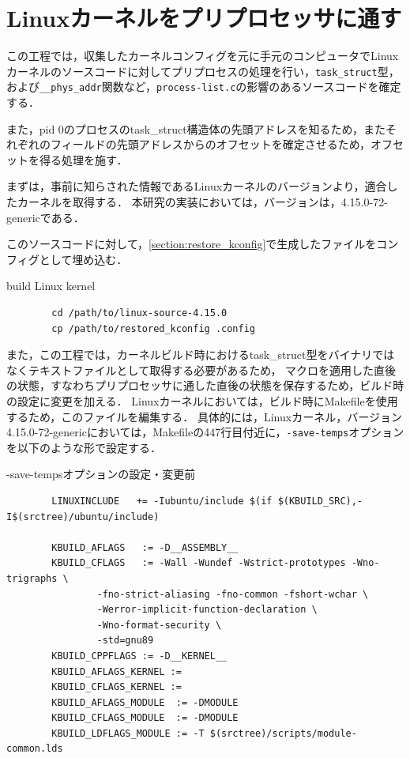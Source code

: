 \section{Linuxカーネルをプリプロセッサに通す}
\label{section:preprocess}

この工程では，収集したカーネルコンフィグを元に手元のコンピュータでLinuxカーネルのソースコードに対してプリプロセスの処理を行い，\verb|task_struct|型，
および\verb|__phys_addr|関数など，\verb|process-list.c|の影響のあるソースコードを確定する．

また，pid 0のプロセスのtask_struct構造体の先頭アドレスを知るため，またそれぞれのフィールドの先頭アドレスからのオフセットを確定させるため，オフセットを得る処理を施す．

まずは，事前に知らされた情報であるLinuxカーネルのバージョンより，適合したカーネルを取得する．
本研究の実装においては，バージョンは，4.15.0-72-genericである．

このソースコードに対して，\ref{section:restore_kconfig}で生成したファイルをコンフィグとして埋め込む．

\begin{itembox}[l]{build Linux kernel}
    \begin{verbatim}
        cd /path/to/linux-source-4.15.0
        cp /path/to/restored_kconfig .config
    \end{verbatim}
\end{itembox}

また，この工程では，カーネルビルド時におけるtask_struct型をバイナリではなくテキストファイルとして取得する必要があるため，
マクロを適用した直後の状態，すなわちプリプロセッサに通した直後の状態を保存するため，ビルド時の設定に変更を加える．
Linuxカーネルにおいては，ビルド時にMakefileを使用するため，このファイルを編集する．
具体的には，Linuxカーネル，バージョン4.15.0-72-genericにおいては，Makefileの447行目付近に，\verb|-save-temps|オプションを以下のような形で設定する．

\begin{itembox}[l]{-save-tempsオプションの設定・変更前}
    \begin{verbatim}
        LINUXINCLUDE   += -Iubuntu/include $(if $(KBUILD_SRC),-I$(srctree)/ubuntu/include)

        KBUILD_AFLAGS   := -D__ASSEMBLY__
        KBUILD_CFLAGS   := -Wall -Wundef -Wstrict-prototypes -Wno-trigraphs \
                -fno-strict-aliasing -fno-common -fshort-wchar \
                -Werror-implicit-function-declaration \
                -Wno-format-security \
                -std=gnu89
        KBUILD_CPPFLAGS := -D__KERNEL__
        KBUILD_AFLAGS_KERNEL :=
        KBUILD_CFLAGS_KERNEL :=
        KBUILD_AFLAGS_MODULE  := -DMODULE
        KBUILD_CFLAGS_MODULE  := -DMODULE
        KBUILD_LDFLAGS_MODULE := -T $(srctree)/scripts/module-common.lds
    \end{verbatim}
\end{itembox}

